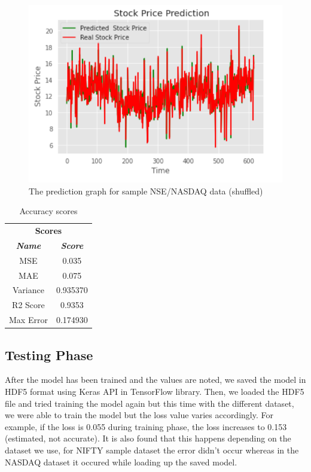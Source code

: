 \documentclass[conference]{IEEEtran}
\begin{document}
\begin{figure}[htbp]
\centerline{\includegraphics[scale=0.7]{predict_1.png}}
\caption{The prediction graph for sample NSE/NASDAQ data (shuffled)}
\label{predict-1}
\end{figure}

\begin{table}[htbp]
	\caption{Accuracy scores}
	\begin{center}
		\begin{tabular}{|c|c|}
			\hline
			\multicolumn{2}{|c|}{\textbf{Scores}} \\
			\cline{1-2} 
			\textbf{\textit{Name}}& \textbf{\textit{Score}} \\
			\hline
			MSE & 0.035 \\
			\hline
			MAE & 0.075 \\
			\hline
			Variance & 0.935370\\
			\hline
			R2 Score & 0.9353 \\
			\hline
			Max Error & 0.174930 \\
			\hline
		\end{tabular}
		\label{tab-mse}
	\end{center}
\end{table}

\subsection{Testing Phase}
After the model has been trained and the values are noted, we saved the model in HDF5 format using Keras API in TensorFlow library. Then, we loaded the HDF5 file and tried training the model again but this time with the different dataset, we were able to train the model but the loss value varies accordingly. For example, if the loss is 0.055 during training phase, the loss increases to 0.153 (estimated, not accurate). It is also found that this happens depending on the dataset we use, for NIFTY sample dataset the error didn't occur whereas in the NASDAQ dataset it occured while loading up the saved model.
\end{document}
